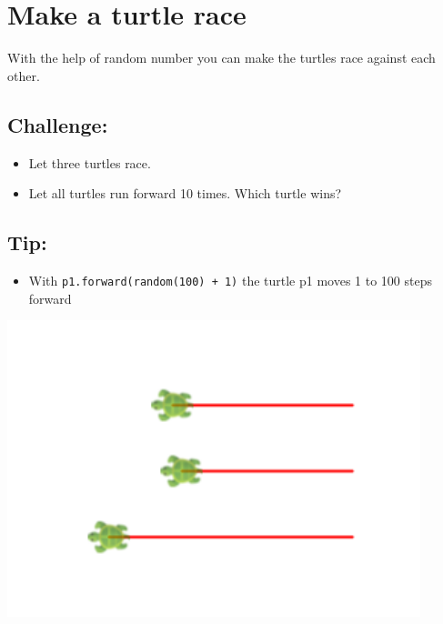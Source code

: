 \chapter{Make a turtle race}
\begin{multicols}{2}
With the help of random number you can make the turtles race against each other.
\section*{\color{BrickRed}Challenge:}


\begin{itemize}

\item {Let three turtles race.}
\item {Let all turtles run forward 10 times. Which turtle wins?}

\end{itemize}


\section*{\color{OliveGreen}Tip:}


\begin{itemize}

\item {With \lstinline{p1.forward(random(100) + 1)} the turtle p1 moves 1 to 100 steps forward}

\end{itemize}



\columnbreak

\begin{center}
\includegraphics[width=12.0cm]{../img/race.png}
\end{center}

\end{multicols}

